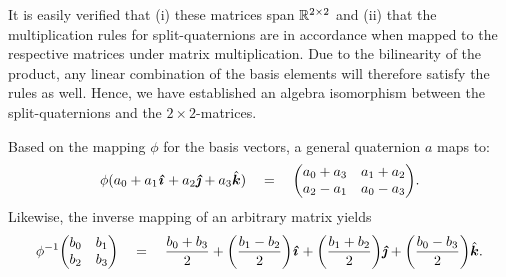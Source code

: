 It is easily verified that (i) these matrices span \(\mathbb{R}^{2\times2}\) and (ii) that the multiplication rules for split-quaternions are in accordance when mapped to the respective matrices under matrix multiplication. Due to the bilinearity of the product, any linear combination of the basis elements will therefore satisfy the rules as well. Hence, we have established an algebra isomorphism between the split-quaternions and the \(2\times 2\)-matrices. 

Based on the mapping \(\phi\) for the basis vectors, a general quaternion $a$ maps to:
\begin{equation}
    \phi(\quat{a_0}{a_1}{a_2}{a_3}) \quad = \quad \mqty(a_0 + a_3 & a_1 + a_2 \\ a_2 - a_1 & a_0 - a_3). 
    \label{eq:quat_isom}
\end{equation}
Likewise, the inverse mapping of an arbitrary matrix yields
\begin{equation}
    \phi^{-1}\mqty(b_0 & b_1 \\ b_2 & b_3) \quad = \quad \quat{\frac{b_0 + b_3}{2}}{\qty(\frac{b_1 - b_2}{2})}{\qty(\frac{b_1 + b_2}{2})}{\qty(\frac{b_0 - b_3}{2})}. 
    \label{eq:inv_quat_isom}
\end{equation}

